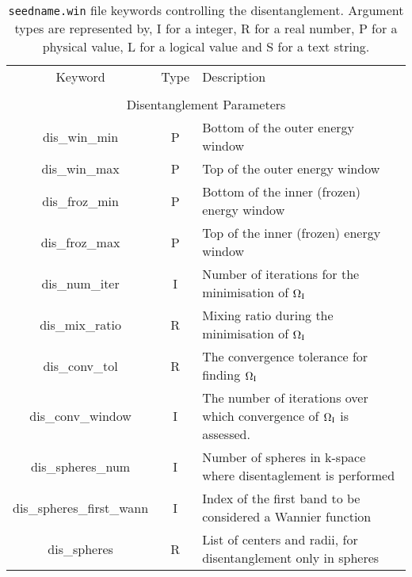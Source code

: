 \begin{table}
\begin{center}
\begin{tabular}{|c|c|p{6cm}|}
\hline
Keyword & Type & Description \\
        &      &             \\
\hline\hline
\multicolumn{3}{|c|}{Disentanglement Parameters} \\
\hline
{\sc dis\_win\_min }   & P & Bottom of the outer energy window \\
{\sc dis\_win\_max }   & P & Top of the outer energy window \\
{\sc dis\_froz\_min }   & P & Bottom of the inner (frozen) energy window \\
{\sc dis\_froz\_max }   & P & Top of the inner (frozen) energy window \\
{\sc dis\_num\_iter }   & I & Number of iterations for the minimisation
of $\Omega_{\mathrm{I}}$ \\
{\sc dis\_mix\_ratio }   & R & Mixing ratio during the minimisation of $\Omega_{\mathrm{I}}$\\
{\sc dis\_conv\_tol }   & R & The convergence tolerance for finding $\Omega_{\mathrm{I}}$ \\
{\sc dis\_conv\_window }   & I & The number of iterations over which
convergence of $\Omega_{\mathrm{I}}$ is assessed. \\ 
{\sc dis\_spheres\_num }   & I & Number of spheres in k-space where disentaglement is performed\\
{\sc dis\_spheres\_first\_wann }   & I & Index of the first band to be considered a Wannier function \\
{\sc dis\_spheres } & R & List of centers and radii, for disentanglement only in spheres \\
\hline
\end{tabular}
\caption[Parameter file keywords controlling disentanglement parameters.]
{{\tt seedname.win} file keywords controlling the disentanglement.
  Argument types 
are represented by, I for a integer, R for a real number, P for a
physical value, L for a logical value and S for a text string.}
\label{parameter_keywords4}
\end{center}
\end{table}



